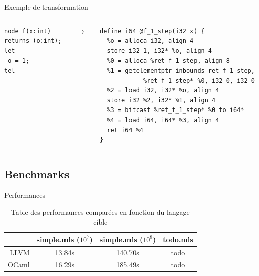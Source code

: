 \documentclass{beamer} %
\begin{document}
\begin{frame}[fragile]{Exemple de transformation}
    \begin{columns}
    \begin{column}{0.25\textwidth}
  \begin{verbatim}
node f(x:int)
returns (o:int);
let
 o = 1;
tel
   \end{verbatim}
    \end{column}
    \begin{column}{0.05\textwidth}
        $\mapsto$
    \end{column}
    \begin{column}{0.70\textwidth}  %
  \begin{verbatim}
define i64 @f_1_step(i32 x) {
  %o = alloca i32, align 4
  store i32 1, i32* %o, align 4
  %0 = alloca %ret_f_1_step, align 8
  %1 = getelementptr inbounds ret_f_1_step,
            %ret_f_1_step* %0, i32 0, i32 0
  %2 = load i32, i32* %o, align 4
  store i32 %2, i32* %1, align 4
  %3 = bitcast %ret_f_1_step* %0 to i64*
  %4 = load i64, i64* %3, align 4
  ret i64 %4
}
   \end{verbatim}
    \end{column}
    \end{columns}
\end{frame}

\subsection{Benchmarks}


\begin{frame}{Performances}
    \begin{table}[h]
        \begin{center}
            \begin{tabular}{|r|c|c|c|}\hline
                                & simple.mls ($10^7$) & simple.mls ($10^8$) & todo.mls \\ \hline\hline
                          LLVM  & 13.84s             & 140.70s            & todo     \\ \hline
                          OCaml & 16.29s             & 185.49s            & todo     \\ \hline
            \end{tabular}
            \caption{Table des performances comparées en fonction du langage cible}
        \end{center}
    \end{table}
\end{frame}
\end{document}
